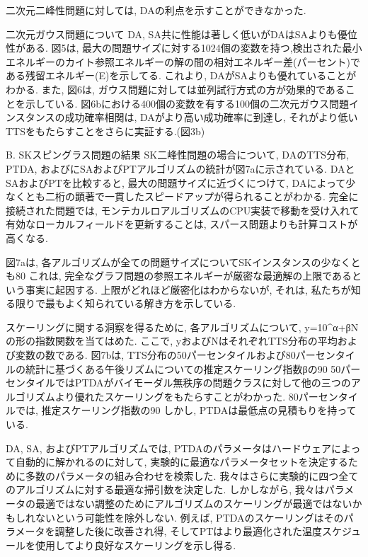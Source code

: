 二次元二峰性問題に対しては, DAの利点を示すことができなかった. 

二次元ガウス問題について
DA, SA共に性能は著しく低いがDAはSAよりも優位性がある. 
図5は, 最大の問題サイズに対する1024個の変数を持つ,検出された最小エネルギーのカイト参照エネルギーの解の間の相対エネルギー差(パーセント)である残留エネルギー(E)を示してる. 
これより, DAがSAよりも優れていることがわかる. 
また, 図6は, ガウス問題に対しては並列試行方式の方が効果的であることを示している.
図6bにおける400個の変数を有する100個の二次元ガウス問題インスタンスの成功確率相関は, DAがより高い成功確率に到達し, それがより低いTTSをもたらすことをさらに実証する.(図3b)

B. SKスピングラス問題の結果
SK二峰性問題の場合について, DAのTTS分布, PTDA, およびにSAおよびPTアルゴリズムの統計が図7aに示されている. 
DAとSAおよびPTを比較すると, 最大の問題サイズに近づくにつけて, DAによって少なくとも二桁の顕著で一貫したスピードアップが得られることがわかる. 
完全に接続された問題では, モンテカルロアルゴリズムのCPU実装で移動を受け入れて有効なローカルフィールドを更新することは, スパース問題よりも計算コストが高くなる. 

図7aは, 各アルゴリズムが全ての問題サイズについてSKインスタンスの少なくとも80%
これは, 完全なグラフ問題の参照エネルギーが厳密な最適解の上限であるという事実に起因する. 
上限がどれほど厳密化はわからないが, それは, 私たちが知る限りで最もよく知られている解き方を示している.

スケーリングに関する洞察を得るために, 各アルゴリズムについて, y=10^α+βNの形の指数関数を当てはめた. 
ここで, yおよびNはそれぞれTTS分布の平均および変数の数である. 
図7bは, TTS分布の50パーセンタイルおよび80パーセンタイルの統計に基づくある午後リズムについての推定スケーリング指数βの90%
50パーセンタイルではPTDAがバイモーダル無秩序の問題クラスに対して他の三つのアルゴリズムより優れたスケーリングをもたらすことがわかった. 
80パーセンタイルでは, 推定スケーリング指数の90%
しかし, PTDAは最低点の見積もりを持っている. 

DA, SA, およびPTアルゴリズムでは, PTDAのパラメータはハードウェアによって自動的に解かれるのに対して, 実験的に最適なパラメータセットを決定するために多数のパラメータの組み合わせを検索した. 
我々はさらに実験的に四つ全てのアルゴリズムに対する最適な掃引数を決定した. 
しかしながら, 我々はパラメータの最適ではない調整のためにアルゴリズムのスケーリングが最適ではないかもしれないという可能性を除外しない. 
例えば, PTDAのスケーリングはそのパラメータを調整した後に改善され得, そしてPTはより最適化された温度スケジュールを使用してより良好なスケーリングを示し得る. 

